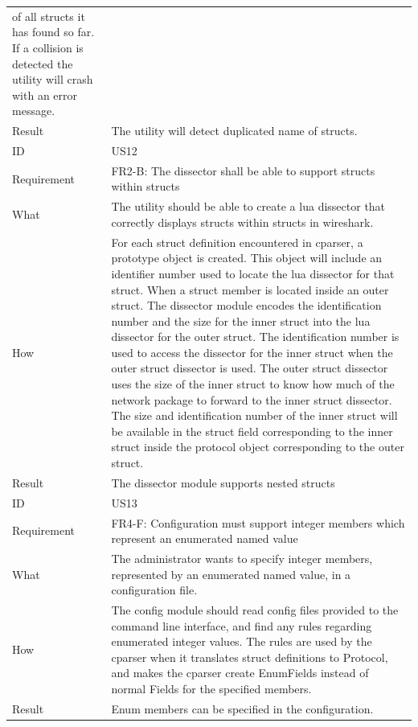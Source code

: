 \begin{table}[htbp]
{\begin{tabularx}{1.2\textwidth}{l X}
		of all \glspl{struct} it has found so far. If a collision is detected the \gls{utility} will crash with an error message. \\
	Result & The \gls{utility} will detect duplicated name of \glspl{struct}. \\
	\midrule
	ID & US12 \\
	Requirement & FR2-B: The \gls{dissector} shall be able to support \glspl{struct} within \glspl{struct} \\
	What & The \gls{utility} should be able to create a \Gls{lua} \gls{dissector} that correctly
	displays \glspl{struct} within \glspl{struct} in \Gls{wireshark}. \\
	How & For each \gls{struct} definition encountered in cparser, a prototype object is created. This object will include an identifier number used to locate
		the \Gls{lua} \gls{dissector} for that \gls{struct}. When a \gls{struct} \gls{member} is located inside an outer \gls{struct}. The \gls{dissector} module encodes the identification number 
		and the size for the inner \gls{struct} into the \Gls{lua} \gls{dissector} for the outer \gls{struct}. The identification number is used to access the \gls{dissector} for the inner
		\gls{struct} when the outer \gls{struct} \gls{dissector} is used. The outer \gls{struct} \gls{dissector} uses the size of the inner \gls{struct} to know how much of the network package
		to forward to the inner \gls{struct} \gls{dissector}. The size and identification number of the inner \gls{struct} will be available in the \gls{struct} field corresponding to
		the inner \gls{struct} inside the \gls{protocol} object corresponding to the outer \gls{struct}.  \\
	Result & The \gls{dissector} module supports nested \glspl{struct} \\
	\midrule
	ID & US13 \\
	Requirement & FR4-F: Configuration must support integer \glspl{member} which represent an enumerated named value \\
	What & The administrator wants to specify integer \glspl{member}, represented by an enumerated named value, in a configuration file. \\
	How & The config module should read config files provided to the command line interface, and find any rules regarding enumerated integer values.
		The rules are used by the cparser when it translates 	\gls{struct} definitions to Protocol, and makes the cparser create EnumFields instead of normal
		Fields for the specified \glspl{member}. \\
	Result & Enum \glspl{member} can be specified in the configuration. \\
	\bottomrule
\end{tabularx}}
\end{table}

